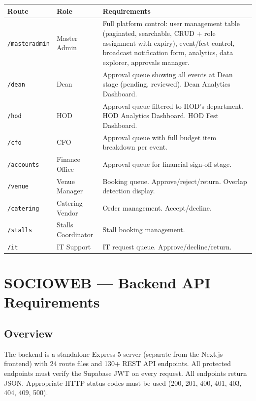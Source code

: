 \documentclass[12pt,a4paper]{article}
\begin{document}
\begin{tabularx}{\textwidth}{L{3cm} L{2.5cm} X}
\toprule
{}
\textbf{Route} & \textbf{Role} & \textbf{Requirements} \\
\midrule
\texttt{/masteradmin} & Master Admin & Full platform control: user management table (paginated, searchable, CRUD + role assignment with expiry), event/fest control, broadcast notification form, analytics, data explorer, approvals manager. \\
\addlinespace
\texttt{/dean} & Dean & Approval queue showing all events at Dean stage (pending, reviewed). Dean Analytics Dashboard. \\
\addlinespace
\texttt{/hod} & HOD & Approval queue filtered to HOD's department. HOD Analytics Dashboard. HOD Fest Dashboard. \\
\addlinespace
\texttt{/cfo} & CFO & Approval queue with full budget item breakdown per event. \\
\addlinespace
\texttt{/accounts} & Finance Office & Approval queue for financial sign-off stage. \\
\addlinespace
\texttt{/venue} & Venue Manager & Booking queue. Approve/reject/return. Overlap detection display. \\
\addlinespace
\texttt{/catering} & Catering Vendor & Order management. Accept/decline. \\
\addlinespace
\texttt{/stalls} & Stalls Coordinator & Stall booking management. \\
\addlinespace
\texttt{/it} & IT Support & IT request queue. Approve/decline/return. \\
\bottomrule
\end{tabularx}

\newpage
\section{SOCIOWEB — Backend API Requirements}

\subsection{Overview}

The backend is a standalone Express 5 server (separate from the Next.js frontend) with 24 route files and 130+ REST API endpoints. All protected endpoints must verify the Supabase JWT on every request. All endpoints return JSON. Appropriate HTTP status codes must be used (200, 201, 400, 401, 403, 404, 409, 500).
\end{document}
